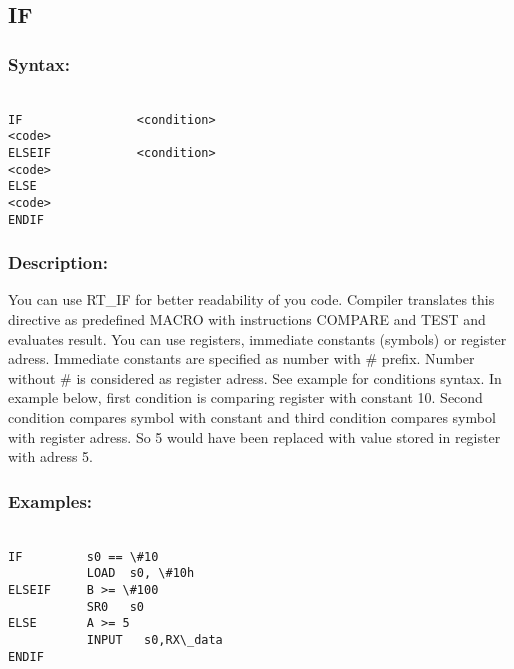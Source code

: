         \subsection{IF}
            \subsubsection{Syntax:}
            {
                ~\\
                \usecodefont
                \verb'IF                <condition>'\\
                \verb'<code>'\\
                \verb'ELSEIF            <condition>'\\
                \verb'<code>'\\
                \verb'ELSE'\\
                \verb'<code>'\\
                \verb'ENDIF'\\
            }

        \subsubsection{Description:}
        You can use RT\_IF for better readability of you code. Compiler translates this directive as predefined MACRO with instructions COMPARE and TEST and
        evaluates result. You can use registers, immediate constants (symbols) or register adress. Immediate constants are specified as number with \# prefix.
        Number without \# is considered as register adress. See example for conditions syntax. In example below, first condition is comparing register with constant 10. Second condition compares symbol with constant and third condition compares
        symbol with register adress. So 5 would have been replaced with value stored in register with adress 5.
        
        \subsubsection{Examples:}
        {
            ~\\
            \usecodefont
            \verb'IF         s0 == \#10'\\
            \verb'           LOAD  s0, \#10h'\\
            \verb'ELSEIF     B >= \#100'\\
            \verb'           SR0   s0'\\
            \verb'ELSE       A >= 5'\\
            \verb'           INPUT   s0,RX\_data'\\
            \verb'ENDIF'
        }
       
